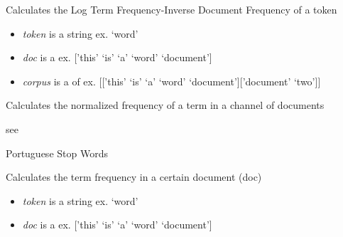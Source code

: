 \documentclass[letterpaper,10pt,english]{sphinxmanual}
\begin{document}

\begin{fulllineitems}
\label{theseus:theseus.logtfidf}
Calculates the Log Term Frequency-Inverse Document Frequency of a token
\begin{itemize}
\item {} 
\emph{token} is a string               ex. `word'

\item {} 
\emph{doc} is a                  ex. {[}'this' `is' `a' `word' `document'{]}

\item {} 
\emph{corpus} is a  of     ex. {[}{[}'this' `is' `a' `word' `document'{]}{[}'document' `two'{]}{]}

\end{itemize}

\end{fulllineitems}


\begin{fulllineitems}
\label{theseus:theseus.normF}
Calculates the normalized frequency of a term in a channel of documents

see {\hyperref[theseus:theseus.tfpdf]{}}

\end{fulllineitems}


\begin{fulllineitems}
\label{theseus:theseus.ptClean}
Portuguese Stop Words

\end{fulllineitems}


\begin{fulllineitems}
\label{theseus:theseus.tf}
Calculates the term frequency in a certain document (doc)
\begin{itemize}
\item {} 
\emph{token} is a string   ex. `word'

\item {} 
\emph{doc} is a      ex. {[}'this' `is' `a' `word' `document'{]}

\end{itemize}

\end{fulllineitems}
\end{document}
